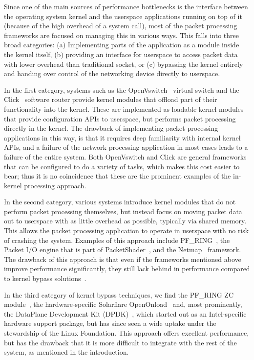 \documentclass[10pt,sigconf]{acmart}
\begin{document}
Since one of the main sources of performance bottlenecks is the interface
between the operating system kernel and the userspace applications running on
top of it (because of the high overhead of a system call), most of the packet
processing frameworks are focused on managing this in various ways. This falls
into three broad categories: (a) Implementing parts of the application as a
module inside the kernel itself, (b) providing an interface for userspace to
access packet data with lower overhead than traditional socket, or (c) bypassing
the kernel entirely and handing over control of the networking device directly
to userspace.

In the first category, systems such as the OpenVswitch~\cite{openvswitch}
virtual switch and the Click~\cite{martins2014clickos} software router provide
kernel modules that offload part of their functionality into the kernel. These
are implemented as loadable kernel modules that provide configuration APIs to
userspace, but performs packet processing directly in the kernel. The drawback
of implementing packet processing applications in this way, is that it requires
deep familiarity with internal kernel APIs, and a failure of the network
processing application in most cases leads to a failure of the entire system.
Both OpenVswitch and Click are general frameworks that can be configured to do a
variety of tasks, which makes this cost easier to bear; thus it is no
coincidence that these are the prominent examples of the in-kernel processing
approach.

In the second category, various systems introduce kernel modules that do not
perform packet processing themselves, but instead focus on moving packet data
out to userspace with as little overhead as possible, typically via shared
memory. This allows the packet processing application to operate in userspace
with no risk of crashing the system. Examples of this approach include
PF\_RING~\cite{deri2009modern}, the Packet I/O engine that is part of
PacketShader~\cite{han2010packetshader}, and the Netmap~\cite{rizzo2012netmap}
framework. The drawback of this approach is that even if the frameworks
mentioned above improve performance significantly, they still lack behind in
performance compared to kernel bypass
solutions~\cite{gallenmuller_comparison_2015}.

In the third category of kernel bypass techniques, we find the PF\_RING ZC
module~\cite{pfringzc}, the hardware-specific Solarflare
OpenOnload~\cite{openonload} and, most prominently, the DataPlane Development
Kit (DPDK)~\cite{dpdk}, which started out as an Intel-specific hardware support
package, but has since seen a wide uptake under the stewardship of the Linux
Foundation. This approach offers excellent performance, but has the drawback
that it is more difficult to integrate with the rest of the system, as mentioned
in the introduction.
\end{document}
